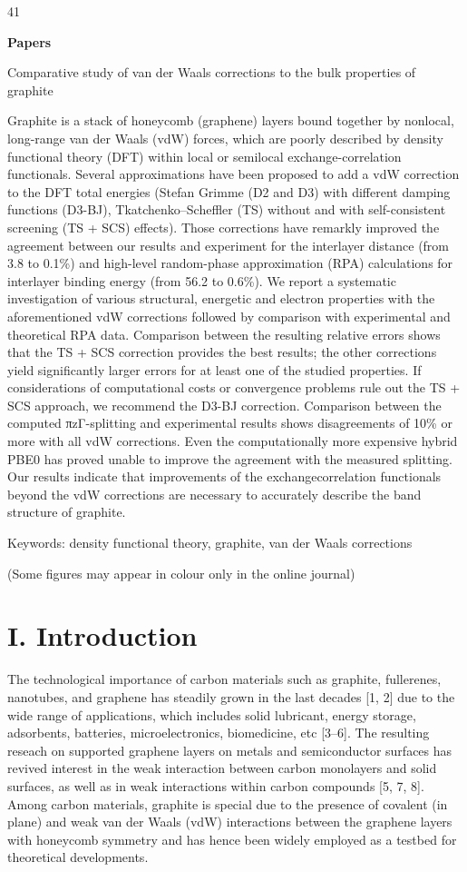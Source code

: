 \documentclass{article}
\begin{document}
41

\textbf{Papers}

Comparative study of van der Waals corrections to the bulk properties of graphite

Graphite is a stack of honeycomb (graphene) layers bound together by nonlocal, long-range van der Waals (vdW) forces, which are poorly described by density functional theory (DFT) within local or semilocal exchange-correlation functionals. Several approximations have been proposed to add a vdW correction to the DFT total energies (Stefan Grimme (D2 and D3) with different damping functions (D3-BJ), Tkatchenko–Scheffler (TS) without and with self-consistent screening (TS + SCS) effects). Those corrections have remarkly improved the agreement between our results and experiment for the interlayer distance (from 3.8 to 0.1\%) and high-level random-phase approximation (RPA) calculations for interlayer binding energy (from 56.2 to 0.6\%). We report a systematic investigation of various structural, energetic and electron properties with the aforementioned vdW corrections followed by comparison with experimental and theoretical RPA data. Comparison between the resulting relative errors shows that the TS + SCS correction provides the best results; the other corrections yield significantly larger errors for at least one of the studied properties. If considerations of computational costs or convergence problems rule out the TS + SCS approach, we recommend the D3-BJ correction. Comparison between the computed πzΓ-splitting and experimental results shows disagreements of 10\% or more with all vdW corrections. Even the computationally more expensive hybrid PBE0 has proved unable to improve the agreement with the measured splitting. Our results indicate that improvements of the exchangecorrelation functionals beyond the vdW corrections are necessary to accurately describe the band structure of graphite.

Keywords: density functional theory, graphite, van der Waals corrections

(Some figures may appear in colour only in the online journal)

\section{I. \textbf{Introduction}}

The technological importance of carbon materials such as graphite, fullerenes, nanotubes, and graphene has steadily grown in the last decades [1, 2] due to the wide range of applications, which includes solid lubricant, energy storage, adsorbents, batteries, microelectronics, biomedicine, etc [3–6]. The resulting reseach on supported graphene layers on metals and semiconductor surfaces has revived interest in the weak interaction between carbon monolayers and solid surfaces, as well as in weak interactions within carbon compounds [5, 7, 8]. Among carbon materials, graphite is special due to the presence of covalent (in plane) and weak van der Waals (vdW) interactions between the graphene layers with honeycomb symmetry and has hence been widely employed as a testbed for theoretical developments.
\end{document}
